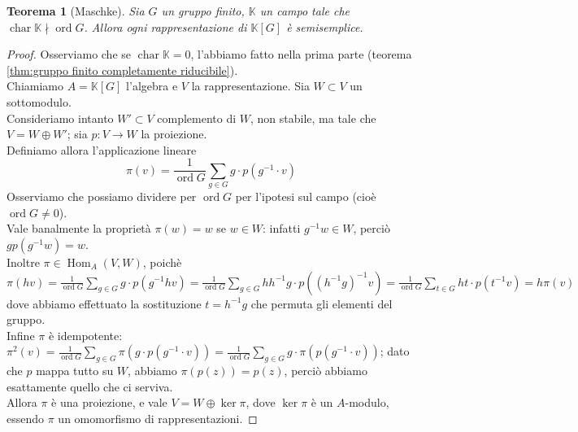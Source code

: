 \documentclass[11pt]{article}
\theoremstyle{plain}
\newtheorem{thm}{Teorema}[section]
\theoremstyle{definition}
\theoremstyle{remark}
\newcommand{\K}{\mathbb{K}}
\DeclareMathOperator{\Hom}{Hom}
\DeclareMathOperator{\Char}{char}
\DeclareMathOperator{\ord}{ord}
\begin{document}
   \begin{thm}[Maschke]\label{thm:maschke}
    Sia $G$ un gruppo finito, $\K$ un campo tale che $\Char\K\nmid\ord G$. Allora ogni rappresentazione di $\K[G]$ è semisemplice.
   \end{thm}
   \begin{proof}
    Osserviamo che se $\Char\K=0$, l'abbiamo fatto nella prima parte (teorema \ref{thm:gruppo finito completamente riducibile}).\\
    Chiamiamo $A=\K[G]$ l'algebra e $V$ la rappresentazione. Sia $W\subset V$ un sottomodulo.\\
    Consideriamo intanto $W'\subset V$ complemento di $W$, non stabile, ma tale che $V=W\oplus W'$; sia $p:V\to W$ la proiezione.\\
    Definiamo allora l'applicazione lineare \[\pi(v)=\frac1{\ord G}\sum_{g\in G} g\cdot p(g^{-1}\cdot v)\]
    Osserviamo che possiamo dividere per $\ord G$ per l'ipotesi sul campo (cioè $\ord G\neq 0$).\\
    Vale banalmente la proprietà $\pi(w)=w$ se $w\in W$: infatti $g^{-1}w\in W$, perciò $gp(g^{-1}w)=w$.\\
    Inoltre $\pi\in\Hom_A(V,W)$, poichè $\displaystyle\pi(hv)=\frac1{\ord G}\sum_{g\in G} g\cdot p(g^{-1}hv)=\frac1{\ord G}\sum_{g\in G} hh^{-1}g\cdot p((h^{-1}g)^{-1}v)=\frac1{\ord G}\sum_{t\in G} ht\cdot p(t^{-1}v)=h\pi(v)$  dove abbiamo effettuato la sostituzione $t=h^{-1}g$ che permuta gli elementi del gruppo.\\
    Infine $\pi$ è idempotente: $\displaystyle\pi^2(v)=\frac1{\ord G}\sum_{g\in G}\pi\left( g\cdot p(g^{-1}\cdot v)\right)=\frac1{\ord G}\sum_{g\in G}g\cdot\pi\left( p(g^{-1}\cdot v)\right)$; dato che $p$ mappa tutto su $W$, abbiamo $\pi(p(z))=p(z)$, perciò abbiamo esattamente quello che ci serviva.\\
    Allora $\pi$ è una proiezione, e vale $V=W\oplus\ker\pi$, dove $\ker\pi$ è un $A$-modulo, essendo $\pi$ un omomorfismo di rappresentazioni.
   \end{proof}
   
\end{document}
